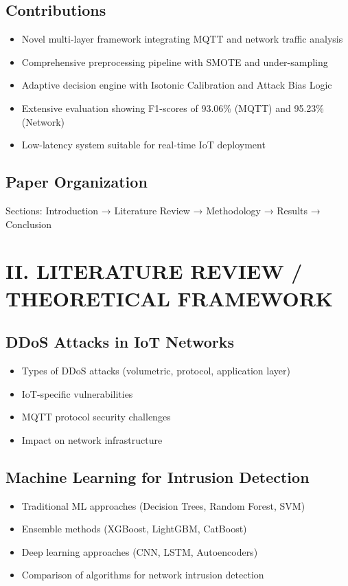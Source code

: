\documentclass[conference]{IEEEtran}
\begin{document}
\subsection{Contributions}
\begin{itemize}
    \item Novel multi-layer framework integrating MQTT and network traffic analysis
    \item Comprehensive preprocessing pipeline with SMOTE and under-sampling
    \item Adaptive decision engine with Isotonic Calibration and Attack Bias Logic
    \item Extensive evaluation showing F1-scores of 93.06\% (MQTT) and 95.23\% (Network)
    \item Low-latency system suitable for real-time IoT deployment
\end{itemize}

\subsection{Paper Organization}
Sections: Introduction → Literature Review → Methodology → Results → Conclusion

\section{II. LITERATURE REVIEW / THEORETICAL FRAMEWORK}

\subsection{DDoS Attacks in IoT Networks}
\begin{itemize}
    \item Types of DDoS attacks (volumetric, protocol, application layer)
    \item IoT-specific vulnerabilities
    \item MQTT protocol security challenges
    \item Impact on network infrastructure
\end{itemize}

\subsection{Machine Learning for Intrusion Detection}
\begin{itemize}
    \item Traditional ML approaches (Decision Trees, Random Forest, SVM)
    \item Ensemble methods (XGBoost, LightGBM, CatBoost)
    \item Deep learning approaches (CNN, LSTM, Autoencoders)
    \item Comparison of algorithms for network intrusion detection
\end{itemize}
\end{document}
